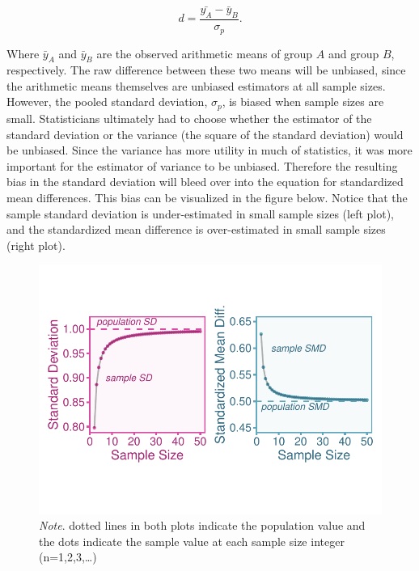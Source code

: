 \documentclass[
  letterpaper,
  DIV=11,
  numbers=noendperiod]{scrreprt}
\begin{document}
\[
d = \frac{\bar{y_A}-\bar{y}_B}{\sigma_p}.
\]

Where \(\bar{y}_A\) and \(\bar{y}_B\) are the observed arithmetic means
of group \(A\) and group \(B\), respectively. The raw difference between
these two means will be unbiased, since the arithmetic means themselves
are unbiased estimators at all sample sizes. However, the pooled
standard deviation, \(\sigma_p\), is biased when sample sizes are small.
Statisticians ultimately had to choose whether the estimator of the
standard deviation or the variance (the square of the standard
deviation) would be unbiased. Since the variance has more utility in
much of statistics, it was more important for the estimator of variance
to be unbiased. Therefore the resulting bias in the standard deviation
will bleed over into the equation for standardized mean differences.
This bias can be visualized in the figure below. Notice that the sample
standard deviation is under-estimated in small sample sizes (left plot),
and the standardized mean difference is over-estimated in small sample
sizes (right plot).

\begin{figure}

{\centering \includegraphics{small_samples_files/figure-pdf/unnamed-chunk-1-1.pdf}

}

\caption{\emph{Note}. dotted lines in both plots indicate the population
value and the dots indicate the sample value at each sample size integer
(n=1,2,3,\ldots)}

\end{figure}
\end{document}

